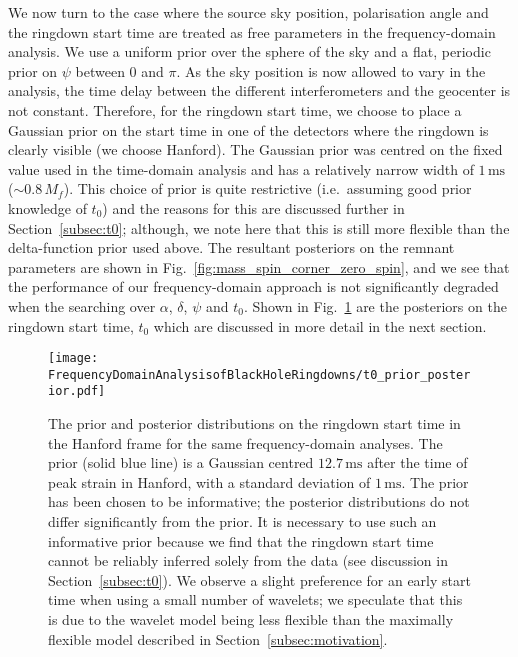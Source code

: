 We now turn to the case where the source sky position, polarisation angle and the ringdown start time are treated as free parameters in the frequency-domain analysis.
We use a uniform prior over the sphere of the sky and a flat, periodic prior on $\psi$ between $0$ and $\pi$.
As the sky position is now allowed to vary in the analysis, the time delay between the different interferometers and the geocenter is not constant. 
Therefore, for the ringdown start time, we choose to place a Gaussian prior on the start time in one of the detectors where the ringdown is clearly visible (we choose Hanford). 
The Gaussian prior was centred on the fixed value used in the time-domain analysis and has a relatively narrow width of $1\,\mathrm{ms}$ ($\sim 0.8\,M_f$).
This choice of prior is quite restrictive (i.e.\ assuming good prior knowledge of $t_0$) and the reasons for this are discussed further in Section~\ref{subsec:t0}; although, we note here that this is still more flexible than the delta-function prior used above.
The resultant posteriors on the remnant parameters are shown in Fig.~\ref{fig:mass_spin_corner_zero_spin}, and we see that the performance of our frequency-domain approach is not significantly degraded when the searching over $\alpha$, $\delta$, $\psi$ and $t_0$.
Shown in Fig.~\ref{fig:t0_prior_posterior} are the posteriors on the ringdown start time, $t_0$ which are discussed in more detail in the next section.

\begin{figure}[t!]
    \centering
    \texttt{[image: FrequencyDomainAnalysisofBlackHoleRingdowns/t0\_prior\_posterior.pdf]}
    \caption[SHORT CAPTION]{ 
    The prior and posterior distributions on the ringdown start time in the Hanford frame for the same frequency-domain analyses. The prior (solid blue line) is a Gaussian centred $12.7\,\mathrm{ms}$ after the time of peak strain in Hanford, with a standard deviation of $1\,\mathrm{ms}$. The prior has been chosen to be informative; the posterior distributions do not differ significantly from the prior.
    It is necessary to use such an informative prior because we find that the ringdown start time cannot be reliably inferred solely from the data (see discussion in Section~\ref{subsec:t0}).
    We observe a slight preference for an early start time when using a small number of wavelets; we speculate that this is due to the wavelet model being less flexible than the maximally flexible model described in Section~\ref{subsec:motivation}.
    }
    \label{fig:t0_prior_posterior}
\end{figure}


